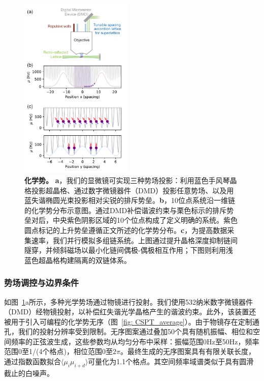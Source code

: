\documentclass[preprint,superscriptaddress,floatfix, nofootinbib]{revtex4-2}
\begin{document}
\begin{CJK*}{UTF8}{gbsn}
\begin{figure}
    \centering
    \includegraphics[width=0.48\textwidth]{figures/chemical_potential.pdf}
    \caption{\textbf{化学势。} \textbf{a}，我们的显微镜可实现三种势场投影：利用蓝色手风琴晶格投影超晶格、通过数字微镜器件（DMD）投影任意势场、以及用蓝失谐椭圆光束投影相对尖锐的排斥势垒。\textbf{b}，10位点系统沿一维链的化学势分布示意图。通过DMD补偿谐波约束与栗色标示的排斥势垒对后，中央紫色阴影区域的10个位点构成了定义明确的系统。紫色圆点标记的上升势垒遵循正文所述的化学势分布。\textbf{c}，为提高数据采集速率，我们并行模拟多组链系统。上图通过提升晶格深度抑制链间隧穿，并倾斜磁场以最小化链间偶极-偶极相互作用；下图则利用浅蓝色超晶格构建隔离的双链体系。}
    \label{fig: chemical_potential}
\end{figure}
\subsubsection*{势场调控与边界条件}

如图~\ref{fig: chemical_potential}a所示，多种光学势场通过物镜进行投射。我们使用532纳米数字微镜器件（DMD）经物镜投射，以补偿红失谐光学晶格产生的谐波约束。此外，该装置还被用于引入可编程的化学势无序（图~\ref{fig: CSPT_average}）。由于物镜存在定制通孔，我们的投射分辨率受到限制。无序图案通过叠加50个具有随机振幅、相位和空间频率的正弦波生成，这些参数均从均匀分布中采样：振幅范围0Hz至50Hz，频率范围0至1/(4个格点)，相位范围0至$2\pi$。最终生成的无序图案具有有限关联长度，通过指数函数拟合$\langle\mu_i \mu_{i+d}\rangle$可量化为1.1个格点。其空间频率域谱类似于具有圆滑截止的白噪声。


\end{CJK*}
\end{document}
